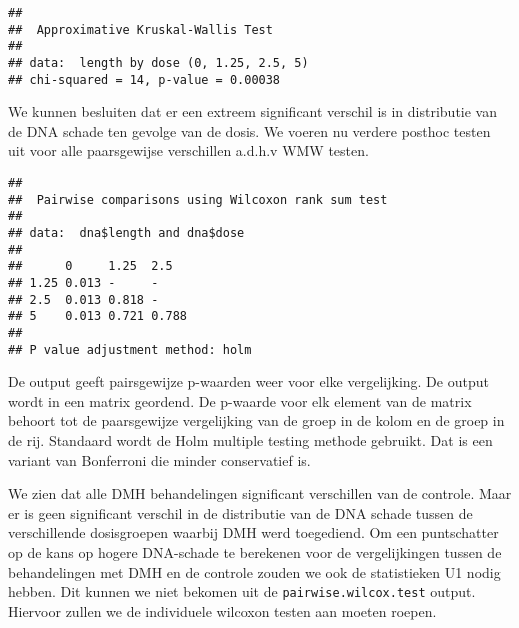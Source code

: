 \documentclass[12pt,dutch,coursenotes]{book}
\newenvironment{Shaded}{\begin{snugshade}}{\end{snugshade}}
\newcommand{\KeywordTok}[1]{\textcolor[rgb]{0.13,0.29,0.53}{\textbf{#1}}}
\newcommand{\StringTok}[1]{\textcolor[rgb]{0.31,0.60,0.02}{#1}}
\newcommand{\OperatorTok}[1]{\textcolor[rgb]{0.81,0.36,0.00}{\textbf{#1}}}
\newcommand{\NormalTok}[1]{#1}
\theoremstyle{definition}
\theoremstyle{definition}
\theoremstyle{definition}
\theoremstyle{remark}
\begin{document}
\begin{verbatim}
## 
##  Approximative Kruskal-Wallis Test
## 
## data:  length by dose (0, 1.25, 2.5, 5)
## chi-squared = 14, p-value = 0.00038
\end{verbatim}

We kunnen besluiten dat er een extreem significant verschil is in
distributie van de DNA schade ten gevolge van de dosis. We voeren nu
verdere posthoc testen uit voor alle paarsgewijse verschillen a.d.h.v
WMW testen.

\begin{Shaded}
\end{Shaded}

\begin{verbatim}
## 
##  Pairwise comparisons using Wilcoxon rank sum test 
## 
## data:  dna$length and dna$dose 
## 
##      0     1.25  2.5  
## 1.25 0.013 -     -    
## 2.5  0.013 0.818 -    
## 5    0.013 0.721 0.788
## 
## P value adjustment method: holm
\end{verbatim}

De output geeft pairsgewijze p-waarden weer voor elke vergelijking. De
output wordt in een matrix geordend. De p-waarde voor elk element van de
matrix behoort tot de paarsgewijze vergelijking van de groep in de kolom
en de groep in de rij. Standaard wordt de Holm multiple testing methode
gebruikt. Dat is een variant van Bonferroni die minder conservatief is.

We zien dat alle DMH behandelingen significant verschillen van de
controle. Maar er is geen significant verschil in de distributie van de
DNA schade tussen de verschillende dosisgroepen waarbij DMH werd
toegediend. Om een puntschatter op de kans op hogere DNA-schade te
berekenen voor de vergelijkingen tussen de behandelingen met DMH en de
controle zouden we ook de statistieken U1 nodig hebben. Dit kunnen we
niet bekomen uit de \texttt{pairwise.wilcox.test} output. Hiervoor
zullen we de individuele wilcoxon testen aan moeten roepen.
\end{document}
